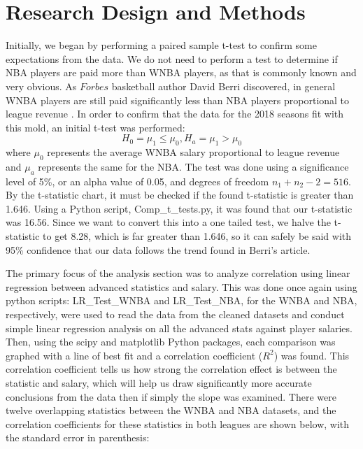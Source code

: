 \documentclass[12pt]{article}
\begin{document}
\section{Research Design and Methods}
\hspace*{10mm}
Initially, we began by performing a paired sample t-test to confirm some expectations from the data. We do not need to perform a test to 
determine if NBA players are paid more than WNBA players, as that is commonly known and very obvious. As $\textit{Forbes}$ basketball author David Berri 
discovered, in general WNBA players are still paid significantly less than NBA players proportional to league revenue \citep{WNBA_Revenue}. In order to 
confirm that the data for the 2018 seasons fit with this mold, an initial t-test was performed:
$$H_0 = \mu_1 \leq \mu_0, H_a = \mu_1 > \mu_0$$
where $\mu_0$ represents the average WNBA salary proportional to league revenue and $\mu_a$ represents the same for the NBA. The test was done using a 
significance level of  5\%, or an alpha value of 0.05, and degrees of freedom $n_1 + n_2 - 2 = 516$. By the t-statistic chart, it must be checked if the 
found t-statistic is greater than 1.646. Using a Python script, Comp\_t\_tests.py, it was found that our t-statistic was 16.56. Since we want to convert 
this into a one tailed test, we halve the t-statistic to get 8.28, which is far greater than 1.646, so it can safely be said with 95\% confidence that our 
data follows the trend found in Berri's article.
\par
The primary focus of the analysis section was to analyze correlation using linear regression between advanced statistics and salary. This was done once 
again using python scripts: LR\_Test\_WNBA and LR\_Test\_NBA, for the WNBA and NBA, respectively, were used to read the data from the cleaned datasets and 
conduct simple linear regression analysis on all the advanced stats against player salaries. Then, using the scipy and matplotlib Python packages, each 
comparison was graphed with a line of best fit and a correlation coefficient ($R^2$) was found. This correlation coefficient tells us how strong the 
correlation effect is between the statistic and salary, which will help us draw significantly more accurate conclusions from the data then if simply the 
slope was examined. There were twelve overlapping statistics between the WNBA and NBA datasets, and the correlation coefficients for these statistics in 
both leagues are shown below, with the standard error in parenthesis:
\end{document}

